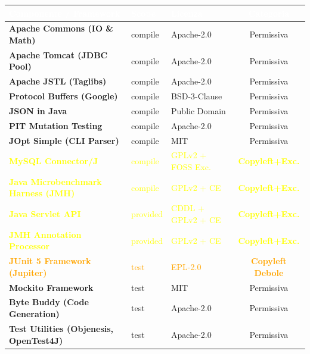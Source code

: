 \documentclass[aspectratio=169]{beamer}
\begin{document}
\begin{frame}
\begin{center}
        \renewcommand{\arraystretch}{0.85}
        \tiny
        \begin{tabular}{lllc}
        \toprule
        \rowcolor{DarkBgGreen}
        \textcolor{white}{\textbf{Componente / Framework}} & \textcolor{white}{\textbf{Scope}} & \textcolor{white}{\textbf{Licenza}} & \textcolor{white}{\textbf{Categoria}} \\
        \midrule
        \rowcolor{DarkBgGreen} \textbf{Apache Commons (IO \& Math)} & compile & Apache-2.0 & Permissiva \\
        \rowcolor{BgGreen} \textbf{Apache Tomcat (JDBC Pool)} & compile & Apache-2.0 & Permissiva \\
        \rowcolor{DarkBgGreen} \textbf{Apache JSTL (Taglibs)} & compile & Apache-2.0 & Permissiva \\
        \rowcolor{BgGreen} \textbf{Protocol Buffers (Google)} & compile & BSD-3-Clause & Permissiva \\
        \rowcolor{DarkBgGreen} \textbf{JSON in Java} & compile & Public Domain & Permissiva \\
        \rowcolor{BgGreen} \textbf{PIT Mutation Testing} & compile & Apache-2.0 & Permissiva \\
        \rowcolor{DarkBgGreen} \textbf{JOpt Simple (CLI Parser)} & compile & MIT & Permissiva \\
        \rowcolor{BgGreen} \textcolor{yellow}{\textbf{MySQL Connector/J}} & \textcolor{yellow}{compile} & \textcolor{yellow}{GPLv2 + FOSS Exc.} & \textcolor{yellow}{\textbf{Copyleft+Exc.}} \\
        \rowcolor{DarkBgGreen} \textcolor{yellow}{\textbf{Java Microbenchmark Harness (JMH)}} & \textcolor{yellow}{compile} & \textcolor{yellow}{GPLv2 + CE} & \textcolor{yellow}{\textbf{Copyleft+Exc.}} \\
        \rowcolor{BgGreen} \textcolor{yellow}{\textbf{Java Servlet API}} & \textcolor{yellow}{provided} & \textcolor{yellow}{CDDL + GPLv2 + CE} & \textcolor{yellow}{\textbf{Copyleft+Exc.}} \\
        \rowcolor{DarkBgGreen} \textcolor{yellow}{\textbf{JMH Annotation Processor}} & \textcolor{yellow}{provided} & \textcolor{yellow}{GPLv2 + CE} & \textcolor{yellow}{\textbf{Copyleft+Exc.}} \\
        \rowcolor{BgGreen} \textcolor{orange}{\textbf{JUnit 5 Framework (Jupiter)}} & \textcolor{orange}{test} & \textcolor{orange}{EPL-2.0} & \textcolor{orange}{\textbf{Copyleft Debole}} \\
        \rowcolor{DarkBgGreen} \textbf{Mockito Framework} & test & MIT & Permissiva \\
        \rowcolor{BgGreen} \textbf{Byte Buddy (Code Generation)} & test & Apache-2.0 & Permissiva \\
        \rowcolor{DarkBgGreen} \textbf{Test Utilities (Objenesis, OpenTest4J)} & test & Apache-2.0 & Permissiva \\
        \bottomrule
        \end{tabular}
    \end{center}
\end{frame}
\end{document}

